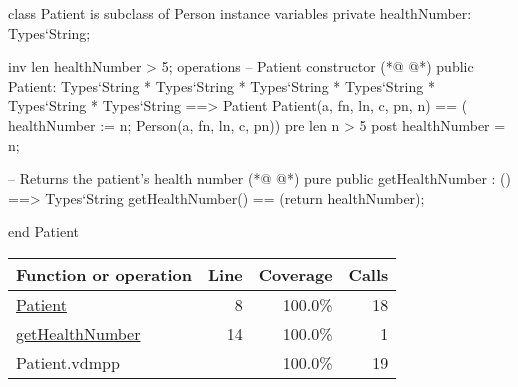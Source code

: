 \begin{vdmpp}[breaklines=true]
class Patient is subclass of Person
instance variables
  private healthNumber: Types`String;
  
  inv len healthNumber > 5;
operations
 -- Patient constructor
(*@
\label{Patient:8}
@*)
 public Patient: Types`String * Types`String * Types`String * Types`String * Types`String * Types`String ==> Patient
  Patient(a, fn, ln, c, pn, n) == ( healthNumber := n; Person(a, fn, ln, c, pn))
 pre len n > 5
 post healthNumber = n;
 
 -- Returns the patient's health number
(*@
\label{getHealthNumber:14}
@*)
 pure public getHealthNumber : () ==> Types`String
  getHealthNumber() == (return healthNumber);

end Patient
\end{vdmpp}
\bigskip
\begin{longtable}{|l|r|r|r|}
\hline
Function or operation & Line & Coverage & Calls \\
\hline
\hline
\hyperref[Patient:8]{Patient} & 8&100.0\% & 18 \\
\hline
\hyperref[getHealthNumber:14]{getHealthNumber} & 14&100.0\% & 1 \\
\hline
\hline
Patient.vdmpp & & 100.0\% & 19 \\
\hline
\end{longtable}

